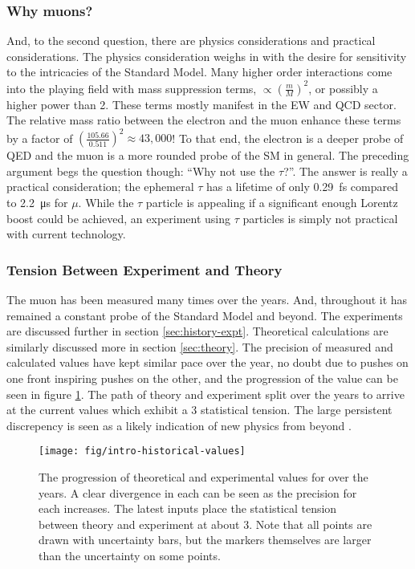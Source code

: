 \subsubsection{Why muons?}
And, to the second question, there are physics considerations and practical considerations.  The physics consideration weighs in with the desire for sensitivity to the intricacies of the Standard Model.  Many higher order interactions come into the playing field with mass suppression terms, $\propto (\frac{m}{M})^2$, or possibly a higher power than 2.  These terms mostly manifest in the EW and QCD sector.  The relative mass ratio between the electron and the muon enhance these terms by a factor of $(\frac{105.66}{0.511})^2 \approx 43,000$\cite{the-muon-g-2}!  To that end, the electron \gmtwo is a deeper probe of QED and the muon \gmtwo is a more rounded probe of the SM in general.  The preceding argument begs the question though: ``Why not use the $\tau$?''.  The answer is really a practical consideration; the ephemeral $\tau$ has a lifetime of only \SI{0.29}{\femto\second} compared to \SI{2.2}{\micro\second} for $\mu$\cite{codata}.  While the $\tau$ particle is appealing if a significant enough Lorentz boost could be achieved, an experiment using $\tau$ particles is simply not practical with current technology.

\subsubsection{Tension Between Experiment and Theory}

The muon \gmtwo has been measured many times over the years.  And, throughout it has remained a constant probe of the Standard Model and beyond.  The experiments are discussed further in section \ref{sec:history-expt}.  Theoretical calculations are similarly discussed more in section \ref{sec:theory}.  The precision of measured and calculated \mugmtwo values have kept similar pace over the year, no doubt due to pushes on one front inspiring pushes on the other, and the progression of the value can be seen in figure \ref{fig:intro-historical-values}.  The path of theory and experiment split over the years to arrive at the current values which exhibit a \SI{3}{\sigma} statistical tension.  The large persistent discrepency is seen as a likely indication of new physics from beyond \tsm.

\begin{figure}
\label{fig:intro-historical-values}
\texttt{[image: fig/intro-historical-values]}
\caption{The progression of theoretical and experimental values for \mugmtwo over the years.  A clear divergence in each can be seen as the precision for each increases.  The latest inputs place the statistical tension between theory and experiment at about \SI{3}{\sigma}. Note that all points are drawn with uncertainty bars, but the markers themselves are larger than the uncertainty on some points.}
\end{figure}

